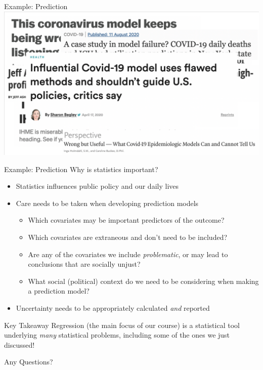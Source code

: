 \documentclass[10pt,t]{beamer}
\begin{document}
\begin{frame}[c]{Example: Prediction}
\centering \includegraphics[scale=0.37]{ihme7.png}
\end{frame}

\begin{frame}{Example: Prediction}
Why is statistics important?
\begin{itemize}
	\item Statistics influences public policy and our daily lives
	\item Care needs to be taken when developing prediction models
	\begin{itemize}
		\item Which covariates may be important predictors of the outcome?
		\item Which covariates are extraneous and don't need to be included?
		\item Are any of the covariates we include \textit{problematic}, or may lead to conclusions that are socially unjust?
		\item What social (political) context do we need to be considering when making a prediction model?
	\end{itemize}
	\item Uncertainty needs to be appropriately calculated \textit{and} reported
\end{itemize}
\end{frame}

\begin{frame}{Key Takeaway}
Regression (the main focus of our course) is a statistical tool underlying \textit{many} statistical problems, including some of the ones we just discussed!
\end{frame}

\begin{frame}[c]
\centering \huge Any Questions?
\end{frame}
\end{document}
